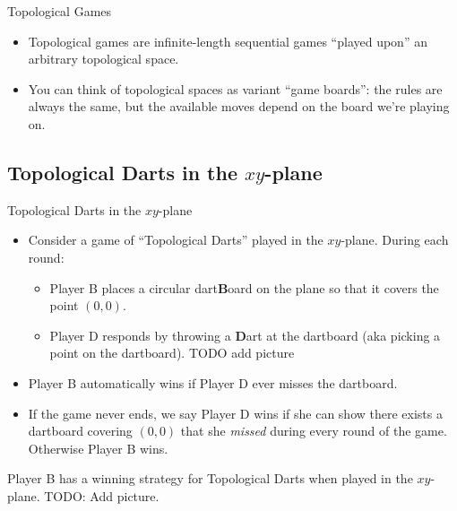 \documentclass{beamer}
\begin{document}
\begin{frame}{Topological Games}
  
  \begin{itemize}
    \item
      Topological games are infinite-length sequential games ``played upon'' an arbitrary topological space.
    \pause
    \item
      You can think of topological spaces as variant ``game boards'': the rules are always the same, but the available moves depend on the board we're playing on.
  \end{itemize}

\end{frame}

\subsection{Topological Darts in the $xy$-plane}

\begin{frame}{Topological Darts in the $xy$-plane}
  \begin{itemize}
    \item
      Consider a game of ``Topological Darts'' played in the $xy$-plane. During each round:
    \pause
    \begin{itemize}
      \item
        Player B places a circular dart\textbf{B}oard on the plane so that it covers the point $(0,0)$.
      \pause
      \item
        Player D responds by throwing a \textbf{D}art at the dartboard (aka picking a point on the dartboard). TODO add picture
    \end{itemize}
  \end{itemize}
\end{frame}

\begin{frame}
  \begin{itemize}
    \item
      Player B automatically wins if Player D ever misses the dartboard.
    \pause
    \item
      If the game never ends, we say Player D wins if she can show there exists a dartboard covering $(0,0)$ that she \textit{missed} during every round of the game. Otherwise Player B wins.
  \end{itemize}
\end{frame}

\begin{frame}
  Player B has a winning strategy for Topological Darts when played in the $xy$-plane. TODO: Add picture.
\end{frame}
\end{document}
